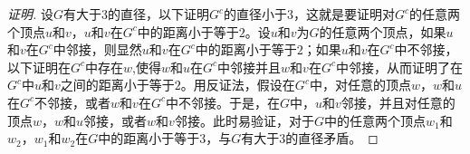 \begin{proof}[证明]
  设$G$有大于$3$的直径，以下证明$G^c$的直径小于$3$，这就是要证明对$G^c$的任意两个顶点$u$和$v$，$u$和$v$在$G^c$中的距离小于等于$2$。设$u$和$v$为$G$的任意两个顶点，如果$u$和$v$在$G^c$中邻接，则显然$u$和$v$在$G^c$中的距离小于等于$2$；如果$u$和$v$在$G^c$中不邻接，以下证明在$G^c$中存在$w$,使得$w$和$u$在$G^c$中邻接并且$w$和$v$在$G^c$中邻接，从而证明了在$G^c$中$u$和$v$之间的距离小于等于$2$。用反证法，假设在$G^c$中，对任意的顶点$w$，$w$和$u$在$G^c$不邻接，或者$w$和$v$在$G^c$中不邻接。于是，在$G$中，$u$和$v$邻接，并且对任意的顶点$w$，$w$和$u$邻接，或者$w$和$v$邻接。此时易验证，对于$G$中的任意两个顶点$w_1$和$w_2$，$w_1$和$w_2$在$G$中的距离小于等于$3$，与$G$有大于$3$的直径矛盾。
\end{proof}
